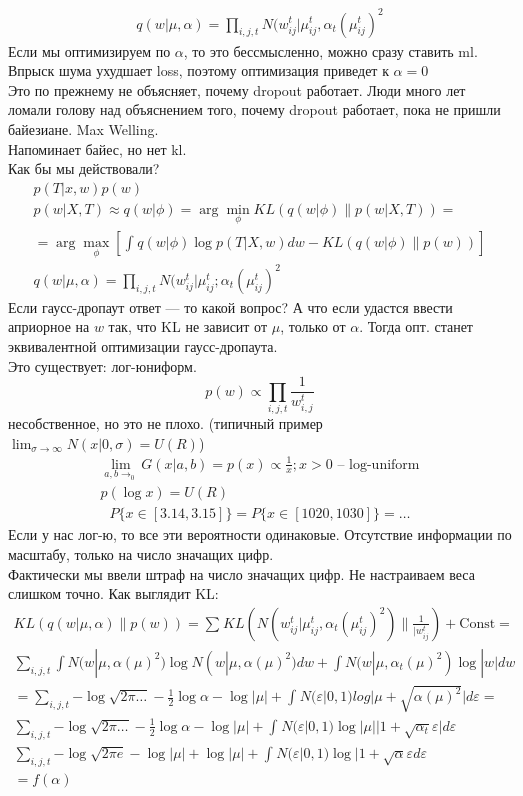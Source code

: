 \documentclass{minimal}
\begin{document}
\begin{gather*}
  q(w|\mu,\alpha)=\prod_{i,j,t}^{} {N(w^t_{ij}|\mu^t_{ij},\alpha_t(\mu^t_{ij})^2}
\end{gather*}
Если мы оптимизируем по $\alpha$, то это бессмысленно, можно сразу ставить ml. Впрыск шума ухудшает loss, поэтому оптимизация приведет к $\alpha=0$\\
Это по прежнему не объясняет, почему dropout работает. Люди много лет ломали голову над объяснением того, почему dropout работает, пока не пришли байезиане. Max Welling.\\
Напоминает байес, но нет kl.\\
Как бы мы действовали?
\begin{gather*}
p(T|x,w)p(w)\\
p(w|X,T)\approx q(w|\phi)=\arg\min_\phi KL\left(q(w|\phi)\|p(w|X,T)\right)=\\
=\arg\max_\phi\left[\int_{}^{} {q(w|\phi)\log p(T|X,w)dw}-KL\left(q(w|\phi)\|p(w)\right)\right]\\
q(w|\mu,\alpha)=\prod_{i,j,t}^{} {N(w^t_{ij}|\mu^{t}_{ij};\alpha_t(\mu^{t}_{ij})^2}
\end{gather*}
Если гаусс-дропаут ответ --- то какой вопрос?
А что если удастся ввести априорное на $w$ так, что KL не зависит от $\mu$, только от $\alpha$. Тогда опт. станет эквивалентной оптимизации гаусс-дропаута.\\
Это существует: лог-юниформ.
\[
  p(w) \propto \prod_{i,j,t}^{} {\frac{1}{w^t_{i,j}}}
\]
несобственное, но это не плохо. (типичный пример $\lim_{\sigma\rightarrow\infty} {N(x|0,\sigma)=U(R)}$)
\begin{gather*}
  \lim_{a,b\rightarrow_0} {G(x|a,b)=p(x)\propto \frac{1}{x}; x>0 \textrm{ -- log-uniform}}\\
  p(\log x)=U(R)
\end{gather*}
\begin{gather*}
  P\{x\in[3.14,3.15]\}=P\{x\in[1020,1030]\}=\dots
\end{gather*}
Если у нас лог-ю, то все эти вероятности одинаковые.
Отсутствие информации по масштабу, только на число значащих цифр.\\
Фактически мы ввели штраф на число значащих цифр. Не настраиваем веса слишком точно.
Как выглядит KL:
\begin{gather*}
KL(q(w|\mu,\alpha)\|p(w))=\sum_{}^{} {KL(N(w^{t}_{ij}|\mu^t_{ij}, \alpha_t(\mu^t_{ij})^2)\|\frac{1}{|w^t_{ij}})}+\mathrm{Const}=\\
\sum_{i,j,t}^{} {\int N(w|\mu,\alpha(\mu)^2)\log N(w|\mu,\alpha(\mu)^2)dw+\int N(w|\mu,\alpha_t(\mu)^2)\log|w|dw}\\
=\sum_{i,j,t}^{} {-\log\sqrt{2\pi\dots}-\frac{1}{2}\log\alpha-\log|\mu|+\int_{}^{} {N(\varepsilon|0,1)log|\mu+\sqrt{\alpha(\mu)^2}|d\varepsilon}}=\\
\sum_{i,j,t}^{} {-\log\sqrt{2\pi\dots}-\frac{1}{2}\log\alpha-\log|\mu|+\int_{}^{} {N(\varepsilon|0,1)\log|\mu||1+\sqrt{\alpha_t}\varepsilon|d\varepsilon}}\\
\sum_{i,j,t} {-\log\sqrt{2\pi e}-\log|\mu|+\log|\mu|+\int_{}^{} {N(\varepsilon|0,1)\log|1+\sqrt{\alpha}\varepsilon}d\varepsilon}\\
=f(\alpha)
\end{gather*}
\end{document}
